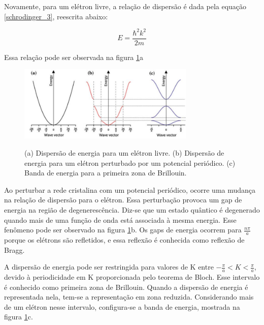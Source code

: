 		\par Novamente, para um elétron livre, a relação de dispersão é dada pela equação \eqref{schrodinger_3}, reescrita abaixo:

		\begin{equation}\label{eq_schrodinger_autovalores_rewrote}
	        E = \frac{\hbar^2 k^2}{2m}
	  	\end{equation}

	  	\par Essa relação pode ser observada na figura \ref{fig6}a

	  	\begin{figure}[H]
	      \caption{(a) Dispersão de energia para um elétron livre. (b) Dispersão de energia para um elétron perturbado por um potencial periódico. (c) Banda de energia para a primeira zona de Brillouin.}
	      \centering
	      \includegraphics[width=0.75\textwidth]{images/figura6.jpg}
	      \label{fig6}
	    \end{figure}

	  	\par Ao perturbar a rede cristalina com um potencial periódico, ocorre uma mudança na relação de dispersão para o elétron. Essa perturbação provoca um gap de energia na região de degenerescência. Diz-se que um estado quântico é degenerado quando mais de uma função de onda está associada à mesma energia. Esse fenômeno pode ser observado na figura \ref{fig6}b. Os gaps de energia ocorrem para $\frac{n\pi}{a}$ porque os elétrons são refletidos, e essa reflexão é conhecida como reflexão de Bragg.

	  	\par A dispersão de energia pode ser restringida para valores de K entre $-\frac{\pi}{a} < K < \frac{\pi}{a}$, devido à periodicidade em K proporcionada pelo teorema de Bloch. Esse intervalo é conhecido como primeira zona de Brillouin. Quando a dispersão de energia é representada nela, tem-se a representação em zona reduzida. Considerando mais de um elétron nesse intervalo, configura-se a banda de energia, mostrada na figura \ref{fig6}c.

